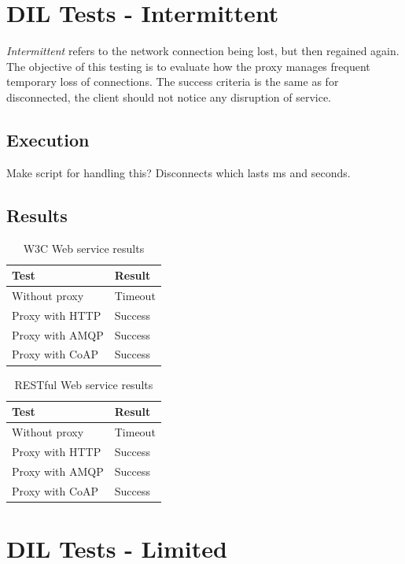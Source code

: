 \section{DIL Tests - Intermittent}

\textit{Intermittent} refers to the network connection being lost, but then
regained again. The objective of this testing is to evaluate how the proxy
manages frequent temporary loss of connections. The success criteria is the same
as for disconnected, the client should not notice any disruption of service.

\subsection{Execution}

Make script for handling this? Disconnects which lasts ms and seconds.

\subsection{Results}

\begin{table}[h!]
\begin{tabular}{| l | l |}
\hline
  \textbf{Test} & \textbf{Result} \\ \hline
  Without proxy & Timeout \\ \hline
  Proxy with HTTP & Success \\ \hline
  Proxy with AMQP & Success \\ \hline
  Proxy with CoAP & Success \\ \hline
\end{tabular}
\caption{W3C Web service results}
\end{table}

\begin{table}[h!]
\begin{tabular}{| l | l |}
\hline
  \textbf{Test} & \textbf{Result} \\ \hline
  Without proxy & Timeout \\ \hline
  Proxy with HTTP & Success \\ \hline
  Proxy with AMQP & Success \\ \hline
  Proxy with CoAP & Success \\ \hline
\end{tabular}
\caption{RESTful Web service results}
\end{table}

\section{DIL Tests - Limited}

